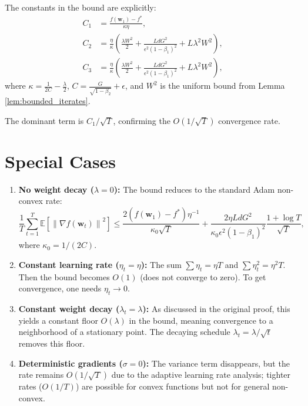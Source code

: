 \documentclass{article}
\theoremstyle{plain}
\theoremstyle{definition}
\renewcommand{\vec}[1]{\boldsymbol{#1}}
\newcommand{\norm}[1]{\left\| #1 \right\|}
\newcommand{\expect}[1]{\mathbb{E}\left[ #1 \right]}
\begin{document}
The constants in the bound are explicitly:
\begin{align*}
    C_1 &= \frac{f(\vec{w}_1) - f^*}{\kappa \eta}, \\
    C_2 &= \frac{\eta}{\kappa} \left( \frac{\lambda W^2}{2} + \frac{L d G^2}{\epsilon^2 (1-\beta_1)^2} + L \lambda^2 W^2 \right), \\
    C_3 &= \frac{\eta}{\kappa} \left( \frac{\lambda W^2}{2} + \frac{L d G^2}{\epsilon^2 (1-\beta_1)^2} + L \lambda^2 W^2 \right),
\end{align*}
where $\kappa = \frac{1}{2C} - \frac{\lambda}{2}$, $C = \frac{G}{\sqrt{1-\beta_2}} + \epsilon$, and $W^2$ is the uniform bound from Lemma \ref{lem:bounded_iterates}.

The dominant term is $C_1 / \sqrt{T}$, confirming the $O(1/\sqrt{T})$ convergence rate.

\section*{Special Cases}

\begin{enumerate}
    \item \textbf{No weight decay ($\lambda = 0$):} The bound reduces to the standard Adam non-convex rate:
    \begin{equation}
        \frac{1}{T} \sum_{t=1}^T \expect{\norm{\nabla f(\vec{w}_t)}^2} \le \frac{2 (f(\vec{w}_1) - f^*) \eta^{-1}}{\kappa_0 \sqrt{T}} + \frac{2 \eta L d G^2}{\kappa_0 \epsilon^2 (1-\beta_1)^2} \frac{1 + \log T}{\sqrt{T}},
    \end{equation}
    where $\kappa_0 = 1/(2C)$.

    \item \textbf{Constant learning rate ($\eta_t = \eta$):} The sum $\sum \eta_t = \eta T$ and $\sum \eta_t^2 = \eta^2 T$. Then the bound becomes $O(1)$ (does not converge to zero). To get convergence, one needs $\eta_t \to 0$.

    \item \textbf{Constant weight decay ($\lambda_t = \lambda$):} As discussed in the original proof, this yields a constant floor $O(\lambda)$ in the bound, meaning convergence to a neighborhood of a stationary point. The decaying schedule $\lambda_t = \lambda/\sqrt{t}$ removes this floor.

    \item \textbf{Deterministic gradients ($\sigma = 0$):} The variance term disappears, but the rate remains $O(1/\sqrt{T})$ due to the adaptive learning rate analysis; tighter rates ($O(1/T)$) are possible for convex functions but not for general non-convex.
\end{enumerate}
\end{document}
